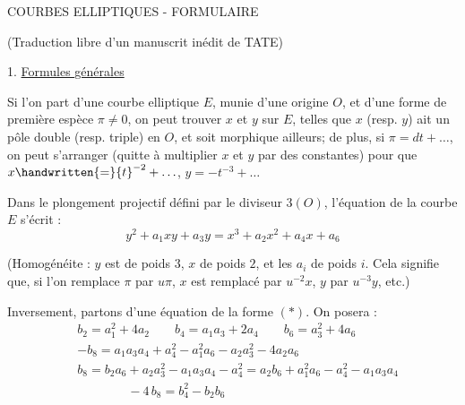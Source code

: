 
\begin{center}
COURBES ELLIPTIQUES - FORMULAIRE

(Traduction libre d'un manuscrit inédit de TATE)
\end{center}


1. \uline{Formules générales}

Si l'on part d'une courbe elliptique $E$, munie d'une origine $O$, et d'une forme de première espèce $\pi\ne 0$, on peut trouver $x$ et $y$ sur $E$, telles que $x$ (resp. $y$) ait un pôle double (resp. triple) en $O$, et soit morphique ailleurs; de plus, si $\pi=dt+\ldots$, on peut s'arranger (quitte à multiplier $x$ et $y$ par des constantes) pour que $x\handwritten{=}{t}^{-2}+\ldots$, $y=-t^{-3}+\ldots$

Dans le plongement projectif défini par le diviseur $3(O)$, l'équation de la courbe $E$ s'écrit :
{\makeatletter\tagsleft@true\makeatother
\[
 y^{2}+a_{1}xy+a_{3}y=x^{3}+a_{2}x^{2}+a_{4}x+a_{6}
 \tag*{$(\ast)$}
\]
}

(Homogénéite : $y$ est de poids $3$, $x$ de poids $2$, et les $a_{i}$ de poids $i$. Cela signifie que, si l'on remplace $\pi$ par $u\pi$, $x$ est remplacé par $u^{-2}x$, $y$ par $u^{-3}y$, etc.)

Inversement, partons d'une équation de la forme $(\ast)$. On posera :
\[
\begin{aligned}
& b_{2}=a_{1}^{2}+4a_{2} \qquad b_{4}=a_{1}a_{3}+2a_{4} \qquad b_{6}=a_{3}^{2}+4a_{6} \\
& -b_{8}=a_{1}a_{3}a_{4}+a_{4}^{2}-a_{1}^{2}a_{6}-a_{2}a_{3}^{2}-4a_{2}a_{6} \\
& b_{8}=b_{2}a_{6}+a_{2}a_{3}^{2}-a_{1}a_{3}a_{4}-a_{4}^{2}=a_{2}b_{6}+a_{1}^{2}a_{6}-a_{4}^{2}-a_{1}a_{3}a_{4} \\
& \hspace{4em}-4\,b_{8}=b_{4}^{2}-b_{2}b_{6}
\end{aligned}
\]
